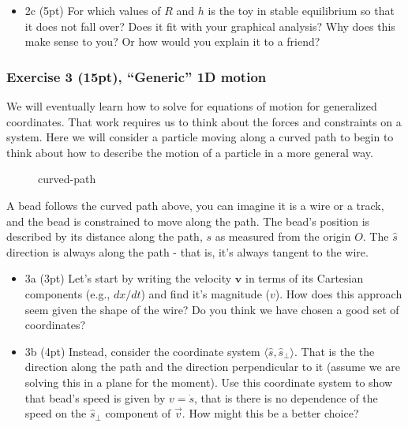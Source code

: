 \documentclass[11pt]{article}
\makeatletter
\providecommand{\tightlist}{%
      \setlength{\itemsep}{0pt}\setlength{\parskip}{0pt}}
\newcommand*\pandocbounded[1]{%
      \sbox\pandoc@box{#1}%
      \Gscale@div\@tempa\textheight{\dimexpr\ht\pandoc@box+\dp\pandoc@box\relax}%
      \Gscale@div\@tempb\linewidth{\wd\pandoc@box}%
      \ifdim\@tempb\p@<\@tempa\p@
        \let\@tempa\@tempb
      \fi
      \ifdim\@tempa\p@<\p@
        \scalebox{\@tempa}{\usebox\pandoc@box}%
      \else
        \usebox{\pandoc@box}%
      \fi
    }
\makeatother
\begin{document}
    \begin{itemize}
\tightlist
\item
  2c (5pt) For which values of \(R\) and \(h\) is the toy in stable
  equilibrium so that it does not fall over? Does it fit with your
  graphical analysis? Why does this make sense to you? Or how would you
  explain it to a friend?
\end{itemize}

    \subsubsection{Exercise 3 (15pt), ``Generic'' 1D
motion}\label{exercise-3-15pt-generic-1d-motion}

We will eventually learn how to solve for equations of motion for
generalized coordinates. That work requires us to think about the forces
and constraints on a system. Here we will consider a particle moving
along a curved path to begin to think about how to describe the motion
of a particle in a more general way.

\begin{figure}
\centering
\pandocbounded{\texttt{[image: ../images/hw5\_5.3-curved\_path.png]}}
\caption{curved-path}
\end{figure}

A bead follows the curved path above, you can imagine it is a wire or a
track, and the bead is constrained to move along the path. The bead's
position is described by its distance along the path, \(s\) as measured
from the origin \(O\). The \(\hat{s}\) direction is always along the
path - that is, it's always tangent to the wire.

\begin{itemize}
\item
  3a (3pt) Let's start by writing the velocity \(\mathbf{v}\) in terms
  of its Cartesian components (e.g., \(dx/dt\)) and find it's magnitude
  (\(v\)). How does this approach seem given the shape of the wire? Do
  you think we have chosen a good set of coordinates?
\item
  3b (4pt) Instead, consider the coordinate system
  \(\langle \hat{s}, \hat{s}_{\perp}\rangle\). That is the the direction
  along the path and the direction perpendicular to it (assume we are
  solving this in a plane for the moment). Use this coordinate system to
  show that bead's speed is given by \(v=\dot{s}\), that is there is no
  dependence of the speed on the \(\hat{s}_{\perp}\) component of
  \(\vec{v}\). How might this be a better choice?
\end{itemize}
\end{document}

